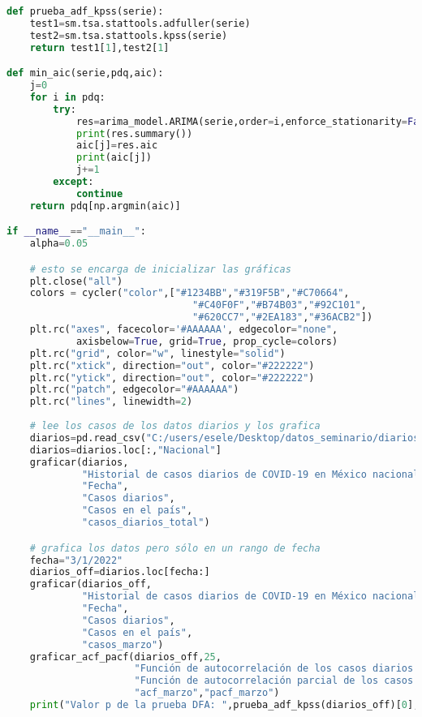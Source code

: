 \documentclass[11pt,letterpaper]{article}
\theoremstyle{definition}
\theoremstyle{theorem}
\theoremstyle{remark}
\begin{document}
\begin{appendices}
\begin{lstlisting}[language=Python]
def prueba_adf_kpss(serie):
    test1=sm.tsa.stattools.adfuller(serie)
    test2=sm.tsa.stattools.kpss(serie)
    return test1[1],test2[1]

def min_aic(serie,pdq,aic):
    j=0
    for i in pdq:
        try:
            res=arima_model.ARIMA(serie,order=i,enforce_stationarity=False,enforce_invertibility=False).fit()
            print(res.summary())
            aic[j]=res.aic
            print(aic[j])
            j+=1
        except:
            continue
    return pdq[np.argmin(aic)]

if __name__=="__main__":
    alpha=0.05

    # esto se encarga de inicializar las gráficas
    plt.close("all")
    colors = cycler("color",["#1234BB","#319F5B","#C70664",
                                "#C40F0F","#B74B03","#92C101",
                                "#620CC7","#2EA183","#36ACB2"])
    plt.rc("axes", facecolor='#AAAAAA', edgecolor="none",
            axisbelow=True, grid=True, prop_cycle=colors)
    plt.rc("grid", color="w", linestyle="solid")
    plt.rc("xtick", direction="out", color="#222222")
    plt.rc("ytick", direction="out", color="#222222")
    plt.rc("patch", edgecolor="#AAAAAA")
    plt.rc("lines", linewidth=2)
    
    # lee los casos de los datos diarios y los grafica
    diarios=pd.read_csv("C:/users/esele/Desktop/datos_seminario/diarios.csv",low_memory=False,index_col='FECHA',parse_dates=True,infer_datetime_format=True)
    diarios=diarios.loc[:,"Nacional"]
    graficar(diarios,
             "Historial de casos diarios de COVID-19 en México nacionales,\nFebrero de 2020 a Mayo de 2022",
             "Fecha",
             "Casos diarios",
             "Casos en el país",
             "casos_diarios_total")

    # grafica los datos pero sólo en un rango de fecha
    fecha="3/1/2022"
    diarios_off=diarios.loc[fecha:]
    graficar(diarios_off,
             "Historial de casos diarios de COVID-19 en México nacionales,\nMarzo a Mayo de 2022",
             "Fecha",
             "Casos diarios",
             "Casos en el país",
             "casos_marzo")
    graficar_acf_pacf(diarios_off,25,
                      "Función de autocorrelación de los casos diarios de COVID-19\na partir de marzo del 2022",
                      "Función de autocorrelación parcial de los casos diarios de COVID-19\na partir de marzo del 2022",
                      "acf_marzo","pacf_marzo")
    print("Valor p de la prueba DFA: ",prueba_adf_kpss(diarios_off)[0],"\nValor p de la prueba KPSS:",prueba_adf_kpss(diarios_off)[1])


\end{lstlisting}
\end{appendices}
\end{document}
